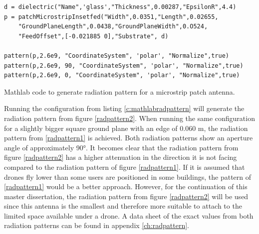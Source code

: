 \begin{listing}[h!]
\begin{verbatim}
d = dielectric("Name",'glass',"Thickness",0.00287,"EpsilonR",4.4)
p = patchMicrostripInsetfed("Width",0.0351,"Length",0.02655,
    "GroundPlaneLength",0.0438,"GroundPlaneWidth",0.O524,
    "FeedOffset",[-0.021885 0],"Substrate", d)

pattern(p,2.6e9, "CoordinateSystem", 'polar', "Normalize",true)
pattern(p,2.6e9, 90, "CoordinateSystem", 'polar', "Normalize",true)
pattern(p,2.6e9, 0, "CoordinateSystem", 'polar', "Normalize",true)
\end{verbatim}
\caption{Mathlab code to generate radiation pattern for a microstrip patch antenna.}
\label{c:mathlabradpattern}
\end{listing}

Running the configuration from listing \ref{c:mathlabradpattern} will generate the radiation pattern from figure \ref{radpattern2}.
When running the same configuration for a slightly bigger square ground plane with an edge of 0.060 m, the radiation pattern from \ref{radpattern1} is
achieved. Both radiation patterns show an aperture angle of approximately 90°. It becomes clear that the radiation pattern from figure \ref{radpattern2} has a higher attenuation in the direction it is not facing compared to
the radiation pattern of figure \ref{radpattern1}. If it is assumed that drones fly lower than some users are positioned in some buildings, the pattern of 
\ref{radpattern1} would be a better approach. However, for the continuation of this master dissertation, the radiation pattern from figure \ref{radpattern2} 
will be used since this antenna is the smallest
and therefore more suitable to attach to the limited space available under a drone.  A data sheet of the exact values from both radiation patterns can be
found in appendix \ref{ch:radpattern}.

